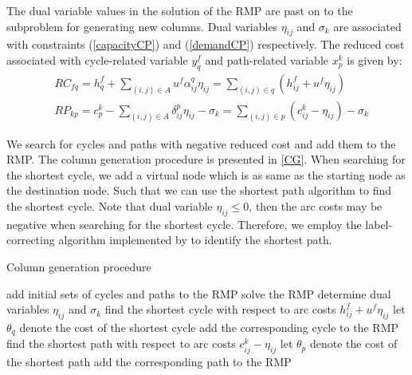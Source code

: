 \documentclass[11pt,nonblindrev,fleqn]{article}
\begin{document}
The dual variable values in the solution of the RMP are past on to the subproblem for generating new columns. Dual variables $\eta_{ij}$ and $\sigma_k$ are associated with constraints (\ref{capacityCP}) and (\ref{demandCP}) respectively. The reduced cost associated with cycle-related variable $y_q^f$ and path-related variable $x_p^k$ is given by:
\begin{align}
& RC_{fq} = h_q^f + \sum_{(i,j)\in A} u^f \alpha_{ij}^q \eta_{ij} = \sum_{(i,j)\in q} (h_{ij}^f + u^f \eta_{ij}) \\
& RP_{kp} = c_p^k - \sum_{(i,j)\in A} \delta_{ij}^p \eta_{ij} - \sigma_k = \sum_{(i,j)\in p} (c_{ij}^k - \eta_{ij}) - \sigma_k
\end{align}

We search for cycles and paths with negative reduced cost and add them to the RMP. The column generation procedure is presented in \autoref{CG}. When searching for the shortest cycle, we add a virtual node which is as same as the starting node as the destination node. Such that we can use the shortest path algorithm to find the shortest cycle. Note that dual variable $\eta_{ij} \leq 0$, then the arc costs may be negative when searching for the shortest cycle. Therefore, we employ the label-correcting algorithm implemented by \cite{Ahuja1993Network} to identify the shortest path.

\vspace{.25in}
\begin{algorithm}[H]
\caption{Column generation procedure}\label{CG}
\LinesNumbered
\SetNlSkip{1.2em}
add initial sets of cycles and paths to the RMP\;
{
    solve the RMP\;
    determine dual variables $\eta_{ij}$ and $\sigma_k$\;
    {
        find the shortest cycle with respect to arc costs $h_{ij}^f + u^f \eta_{ij}$\;
        let $\theta_q$ denote the cost of the shortest cycle\;
        {
            add the corresponding cycle to the RMP\;
        }
    }
    {
        find the shortest path with respect to arc costs $c_{ij}^k - \eta_{ij}$\;
        let $\theta_p$ denote the cost of the shortest path\;
        {
            add the corresponding path to the RMP\;
        }
    }
}
\end{algorithm}
\end{document}
